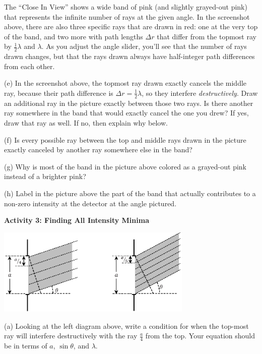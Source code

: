 The ``Close In View'' shows a wide band of pink (and slightly grayed-out pink) that represents the infinite number of rays at the given angle.  In the screenshot above, there are also three specific rays that are drawn in red: one at the very top of the band, and two more with path lengths $\Delta r$ that differ from the topmost ray by $\frac{1}{2} \lambda$ and $\lambda$.  As you adjust the angle slider, you'll see that the number of rays drawn changes, but that the rays drawn always have half-integer path differences from each other. 

(e) In the screenshot above, the topmost ray drawn exactly cancels the middle ray, because their path difference is $\Delta r = \frac{1}{2} \lambda$, so they interfere \textit{destructively}.  Draw an additional ray in the picture exactly between those two rays.  Is there another ray somewhere in the band that would exactly cancel the one you drew?  If yes, draw that ray as well.  If no, then explain why below.
\answerspace{0.5in}

(f) Is every possible ray between the top and middle rays drawn in the picture exactly canceled by another ray somewhere else in the band?
\answerspace{0.4in}

(g) Why is most of the band in the picture above colored as a grayed-out pink instead of a brighter pink?
\answerspace{0.4in}

(h) Label in the picture above the part of the band that actually contributes to a non-zero intensity at the detector at the angle pictured.

\pagebreak[3]
\textbf{Activity 3: Finding All Intensity Minima}


\vspace{-0.2in}
\begin{center}
\includegraphics[width=0.7\textwidth]{diffraction_of_light/fourths_and_sixths.eps}
\end{center}
\vspace{-0.2in}

(a) Looking at the left diagram above, write a condition for when the top-most ray will interfere destructively with the ray $\frac{a}{4}$ from the top.  Your equation should be in terms of $a$, $\sin \theta$, and $\lambda$.  
\answerspace{0.4in}

